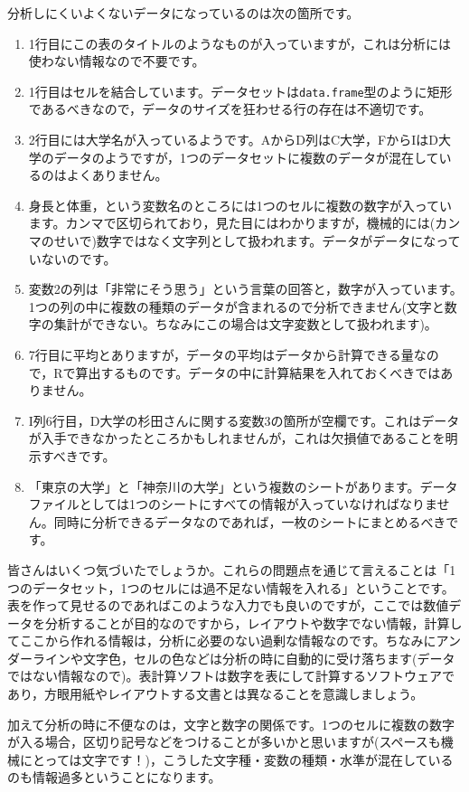 \documentclass{ltjsbook}
\begin{document}
分析しにくいよくないデータになっているのは次の箇所です。
\begin{enumerate}
	\item 1行目にこの表のタイトルのようなものが入っていますが，これは分析には使わない情報なので不要です。
	\item 1行目はセルを結合しています。データセットは\texttt{data.frame}型のように矩形であるべきなので，データのサイズを狂わせる行の存在は不適切です。
	\item 2行目には大学名が入っているようです。AからD列はC大学，FからIはD大学のデータのようですが，1つのデータセットに複数のデータが混在しているのはよくありません。
	\item 身長と体重，という変数名のところには1つのセルに複数の数字が入っています。カンマで区切られており，見た目にはわかりますが，機械的には(カンマのせいで)数字ではなく文字列として扱われます。データがデータになっていないのです。
	\item 変数2の列は「非常にそう思う」という言葉の回答と，数字が入っています。1つの列の中に複数の種類のデータが含まれるので分析できません(文字と数字の集計ができない。ちなみにこの場合は文字変数として扱われます)。
	\item 7行目に平均とありますが，データの平均はデータから計算できる量なので，Rで算出するものです。データの中に計算結果を入れておくべきではありません。
	\item I列6行目，D大学の杉田さんに関する変数3の箇所が空欄です。これはデータが入手できなかったところかもしれませんが，これは欠損値であることを明示すべきです。
	\item 「東京の大学」と「神奈川の大学」という複数のシートがあります。データファイルとしては1つのシートにすべての情報が入っていなければなりません。同時に分析できるデータなのであれば，一枚のシートにまとめるべきです。
\end{enumerate}
皆さんはいくつ気づいたでしょうか。これらの問題点を通じて言えることは「1つのデータセット，1つのセルには過不足ない情報を入れる」ということです。表を作って見せるのであればこのような入力でも良いのですが，ここでは数値データを分析することが目的なのですから，レイアウトや数字でない情報，計算してここから作れる情報は，分析に必要のない過剰な情報なのです。ちなみにアンダーラインや文字色，セルの色などは分析の時に自動的に受け落ちます(データではない情報なので)。表計算ソフトは数字を表にして計算するソフトウェアであり，方眼用紙やレイアウトする文書とは異なることを意識しましょう。

加えて分析の時に不便なのは，文字と数字の関係です。1つのセルに複数の数字が入る場合，区切り記号などをつけることが多いかと思いますが(スペースも機械にとっては文字です！)，こうした文字種・変数の種類・水準が混在しているのも情報過多ということになります。
\end{document}
